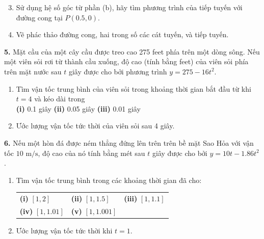 \begin{minipage}[t]{0.485\textwidth}
\fontsize{8.7pt}{11pt}\selectfont

\begin{enumerate}[label=\textbf{(\alph*)}, leftmargin=*]
    \setcounter{enumi}{2}
    \item Sử dụng hệ số góc từ phần (b), hãy tìm phương trình của tiếp tuyến với đường cong tại $P(0.5, 0)$.
    \item Vẽ phác thảo đường cong, hai trong số các cát tuyến, và tiếp tuyến.
\end{enumerate}

\vspace{5pt}
\textbf{5.} Mặt cầu của một cây cầu được treo cao 275 feet phía trên một dòng sông. Nếu một viên sỏi rơi từ thành cầu xuống, độ cao (tính bằng feet) của viên sỏi phía trên mặt nước sau $t$ giây được cho bởi phương trình $y = 275 - 16t^2$.
\begin{enumerate}[label=\textbf{(\alph*)}, leftmargin=*]
    \item Tìm vận tốc trung bình của viên sỏi trong khoảng thời gian bắt đầu từ khi $t = 4$ và kéo dài trong\\
    \textbf{(i)} 0.1 giây \qquad \textbf{(ii)} 0.05 giây \qquad \textbf{(iii)} 0.01 giây
    \item Ước lượng vận tốc tức thời của viên sỏi sau 4 giây.
\end{enumerate}

\vspace{5pt}
\textbf{6.} Nếu một hòn đá được ném thẳng đứng lên trên trên bề mặt Sao Hỏa với vận tốc $10\text{ m/s}$, độ cao của nó tính bằng mét sau $t$ giây được cho bởi $y = 10t - 1.86t^2$.
\begin{enumerate}[label=\textbf{(\alph*)}, leftmargin=*]
    \item Tìm vận tốc trung bình trong các khoảng thời gian đã cho:
    \begin{center}
    \vspace{-1pt}
    \begin{tabular}{@{}lll@{}}
    \textbf{(i)} $[1, 2]$ & \textbf{(ii)} $[1, 1.5]$ & \textbf{(iii)} $[1, 1.1]$ \\
    \textbf{(iv)} $[1, 1.01]$ & \textbf{(v)} $[1, 1.001]$ &
    \end{tabular}
    \vspace{-1pt}
    \end{center}
    \item Ước lượng vận tốc tức thời khi $t = 1$.
\end{enumerate}


\end{minipage}
